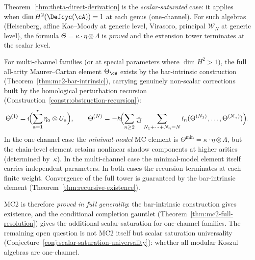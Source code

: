 \begin{remark}
\label{rem:scalar-saturation-scope-v2}
Theorem~\textup{\ref{thm:theta-direct-derivation}} is the
\emph{scalar-saturated} case: it applies when
$\dim H^2(\Defcyc(\cA)) = 1$ at each genus
\textup{(}one-channel\textup{)}.  For such algebras
\textup{(}Heisenberg, affine Kac--Moody at generic level,
Virasoro, principal $\mathcal{W}_N$ at generic level\textup{)},
the formula $\Theta = \kappa \cdot \eta \otimes \Lambda$ is
\emph{proved} and the extension tower terminates at the scalar
level.

For multi-channel families \textup{(}or at special parameters
where $\dim H^2 > 1$\textup{)}, the full all-arity
Maurer--Cartan element $\Theta_\cA$ exists by the bar-intrinsic
construction \textup{(}Theorem~\textup{\ref{thm:mc2-bar-intrinsic}}),
carrying genuinely non-scalar corrections built by the
homological perturbation recursion
\textup{(}Construction~\textup{\ref{constr:obstruction-recursion}}):
\[
\Theta^{(1)} = i\!\Bigl(\sum_{a=1}^r \eta_a \otimes U_a\Bigr),
\qquad
\Theta^{(N)} = -h\!\Bigl(\sum_{n \geq 2}
\tfrac{1}{n!}\sum_{N_1+\cdots+N_n=N}
l_n(\Theta^{(N_1)},\ldots,\Theta^{(N_n)})\Bigr).
\]
In the one-channel case the \emph{minimal-model} MC element
is $\Theta^{\min} = \kappa \cdot \eta \otimes \Lambda$, but the
chain-level element retains nonlinear shadow components
at higher arities (determined by~$\kappa$).  In the multi-channel
case the minimal-model element itself carries independent parameters.
In both cases the recursion terminates at each finite weight.
Convergence of the full tower is guaranteed by the bar-intrinsic
element \textup{(}Theorem~\textup{\ref{thm:recursive-existence})}.

MC2 is therefore \emph{proved in full generality}: the bar-intrinsic
construction gives existence, and the conditional completion gauntlet
\textup{(}Theorem~\textup{\ref{thm:mc2-full-resolution})} gives
the additional scalar saturation for one-channel families.
The remaining open question is not MC2 itself but scalar saturation
universality
\textup{(}Conjecture~\textup{\ref{conj:scalar-saturation-universality}}):
whether all modular Koszul algebras are one-channel.
\end{remark}

